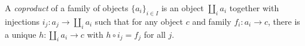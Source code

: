 A \emph{coproduct} of a family of objects $\{a_i\}_{i \in I}$ is an object $\coprod_i a_i$ together with injections $i_j: a_j \to \coprod_i a_i$ such that for any object $c$ and family $f_i: a_i \to c$, there is a unique $h: \coprod_i a_i \to c$ with $h \circ i_j = f_j$ for all $j$.
